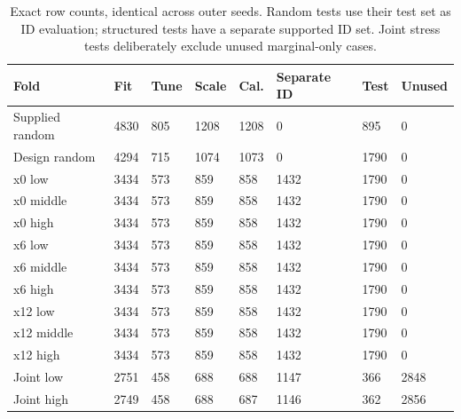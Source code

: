 \begin{table}[htbp]\centering\small\setlength{\tabcolsep}{3pt}\begin{tabular}{llllllll}
\toprule
Fold & Fit & Tune & Scale & Cal. & Separate ID & Test & Unused\\\midrule
Supplied random & 4830 & 805 & 1208 & 1208 & 0 & 895 & 0\\
Design random & 4294 & 715 & 1074 & 1073 & 0 & 1790 & 0\\
x0 low & 3434 & 573 & 859 & 858 & 1432 & 1790 & 0\\
x0 middle & 3434 & 573 & 859 & 858 & 1432 & 1790 & 0\\
x0 high & 3434 & 573 & 859 & 858 & 1432 & 1790 & 0\\
x6 low & 3434 & 573 & 859 & 858 & 1432 & 1790 & 0\\
x6 middle & 3434 & 573 & 859 & 858 & 1432 & 1790 & 0\\
x6 high & 3434 & 573 & 859 & 858 & 1432 & 1790 & 0\\
x12 low & 3434 & 573 & 859 & 858 & 1432 & 1790 & 0\\
x12 middle & 3434 & 573 & 859 & 858 & 1432 & 1790 & 0\\
x12 high & 3434 & 573 & 859 & 858 & 1432 & 1790 & 0\\
Joint low & 2751 & 458 & 688 & 688 & 1147 & 366 & 2848\\
Joint high & 2749 & 458 & 688 & 687 & 1146 & 362 & 2856\\
\bottomrule\end{tabular}\caption{Exact row counts, identical across outer seeds. Random tests use their test set as ID evaluation; structured tests have a separate supported ID set. Joint stress tests deliberately exclude unused marginal-only cases.}\label{tab:ubend-split_counts}\end{table}
